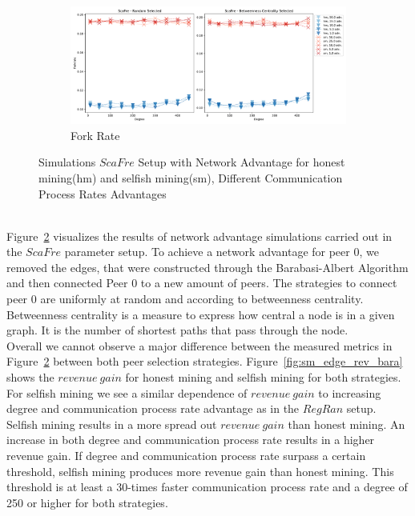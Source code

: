 \begin{figure}[tbp]
\ContinuedFloat
	\begin{subfigure}[b]{\textwidth}
		\includegraphics[width=\textwidth]{figures/sm_edge_forkrate_barabasi.pdf}
		\caption{Fork Rate}
		\label{fig:fork_bara}
	\end{subfigure}
\caption{Simulations $ScaFre$ Setup with Network Advantage for honest mining(hm) and selfish mining(sm), Different Communication Process Rates Advantages}
\label{fig:sm_edge_barabasi}
\end{figure}\\
Figure~\ref{fig:sm_edge_barabasi} visualizes the results of network advantage simulations carried out in the $ScaFre$ parameter setup. To achieve a network advantage for peer $0$, we removed the edges, that were constructed through the Barabasi-Albert Algorithm and then connected Peer $0$ to a new amount of peers. The strategies to connect peer $0$ are uniformly at random and according to betweenness centrality. Betweenness centrality is a measure to express how central a node is in a given graph. It is the number of shortest paths that pass through the node\cite{bcent}.\\
Overall we cannot observe a major difference between the measured metrics in Figure~\ref{fig:sm_edge_barabasi} between both peer selection strategies. Figure~\ref{fig:sm_edge_rev_bara} shows the $revenue~gain$ for honest mining and selfish mining for both strategies. For selfish mining we see a similar dependence of $revenue~gain$ to increasing degree and communication process rate advantage as in the $RegRan$ setup. Selfish mining results in a more spread out $revenue~gain$ than honest mining. An increase in both degree and communication process rate results in a higher revenue gain. If degree and communication process rate surpass a certain threshold, selfish mining produces more revenue gain than honest mining. This threshold is at least a 30-times faster communication process rate and a degree of 250 or higher for both strategies.\\
